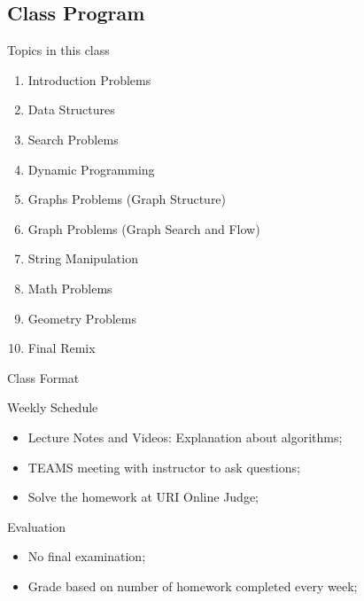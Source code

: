 \subsection{Class Program}
\begin{frame}{Topics in this class}
  \begin{enumerate}
    \item Introduction Problems
    \item Data Structures
    \item Search Problems
    \item Dynamic Programming
    \item Graphs Problems (Graph Structure)
    \item Graph Problems (Graph Search and Flow)
    \item String Manipulation
    \item Math Problems
    \item Geometry Problems
    \item Final Remix
  \end{enumerate}
\end{frame}

\begin{frame}{Class Format}
  \begin{block}{Weekly Schedule}
    \begin{itemize}
      \item Lecture Notes and Videos: Explanation about algorithms;
      \item TEAMS meeting with instructor to ask questions;
      \item Solve the homework at URI Online Judge;
    \end{itemize}
  \end{block}

  \begin{exampleblock}{Evaluation}
    \begin{itemize}
      \item No final examination;
      \item Grade based on number of homework completed every week;
    \end{itemize}
  \end{exampleblock}
\end{frame}

